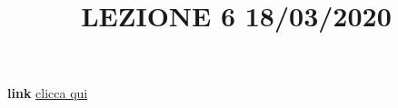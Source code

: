 \title{LEZIONE 6 18/03/2020}\newline
\textbf{link} \href{https://web.microsoftstream.com/video/0c2093a0-44b9-4c83-a0b1-7e61fbd111b5?list=user&userId=faa91214-a6f5-40d7-8875-253fd49b8ce1}{clicca qui}
\subsection{}